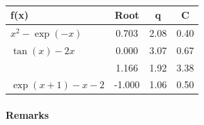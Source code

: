 \documentclass[a4paper,11]{article}
\begin{document}
\begin{table}[ht]
	\centering
	\begin{tabular}{l|c|c|c}
		f(x) & Root & \approx q & \approx C \\
		\hline
		$x^{2} - \exp(-x)$    & 0.703  & 2.08 & 0.40\\
		$\tan(x) - 2x$        & 0.000  & 3.07 & 0.67\\
		                      & 1.166  & 1.92 & 3.38\\
		$\exp(x + 1) - x - 2$ & -1.000 & 1.06 & 0.50
	\end{tabular}
	\caption{}
	\label{table:newt_conv_data}
\end{table}

\paragraph{Remarks}
\end{document}
